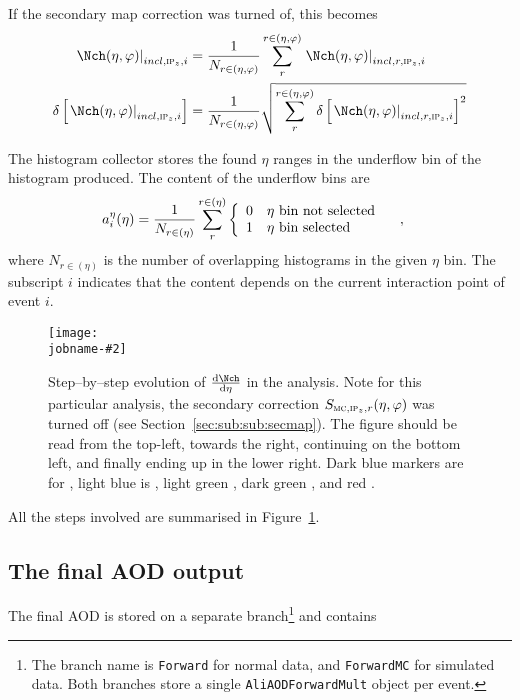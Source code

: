 \documentclass[compat,11pt]{alicenote}
\DeclareRobustCommand{\AlwaysText}[1]{\ifmmode\relax\text{#1}\else #1\fi}
\newcommand*{\etaphi}{\ensuremath(\eta,\varphi)}
\newcommand*\SecMap{\ensuremath S_{\subMC,\subIPz,r}\etaphi}
\newcommand{\AOD}{\AlwaysText{AOD}}
\newcommand{\secref}[1]{Section~\ref{#1}}
\newcommand{\figref}[1]{Figure~\ref{#1}}
\newcommand{\dndetadphi}[1][]{{\ensuremath%
    \ifx|#1|\else\left.\fi%
      \Nch\etaphi%
      \ifx|#1|\else\right|_{#1}\fi}}
\newcommand{\etaCov}{\ensuremath a_i^{\eta}(\eta)}
\newcommand\figinput[2][\textwidth]{%
  \texttt{[image: \\jobname-\#2]}}
\begin{document}
If the secondary map correction was turned of, this becomes 
\begin{align}
  \label{eq:superhist:2}
  \dndetadphi[incl,\subIPz,i] &=
  \frac{1}{N_{r\in\etaphi}}\sum_{r}^{r\in\etaphi}  
  \dndetadphi[incl,r,\subIPz,i]\\
  \delta\left[\dndetadphi[incl,\subIPz,i]\right] &=
  \frac{1}{N_{r\in\etaphi}}\sqrt{\sum_{r}^{r\in\etaphi}   
    \delta\left[\dndetadphi[incl,r,\subIPz,i]\right]^2}
\end{align}

The histogram collector stores the found $\eta$ ranges in the
underflow bin of the histogram produced.  The content of the underflow
bins are 
\begin{align}
  \label{eq:underflow}
  \etaCov &= 
  \frac{1}{N_{r\in(\eta)}}
  \sum_{r}^{r\in(\eta)} \left\{\begin{array}{cl} 
      0 & \eta \text{\ bin not selected}\\ 
      1 & \eta \text{\ bin selected}
      \end{array}\right.\quad,
\end{align}
where $N_{r\in(\eta)}$ is the number of overlapping histograms in the
given $\eta$ bin.  The subscript $i$ indicates that the content
depends on the current interaction point of event $i$.

\begin{figure}[]
  \centering
  \figinput[.9\textwidth]{steps}
  \caption{Step--by--step evolution of $\dndeta$ in the analysis.
    Note for this particular analysis, the secondary correction
    $\SecMap{}$ was turned off (see \secref{sec:sub:sub:secmap}). The
    figure should be read from the top-left, towards the right,
    continuing on the bottom left, and finally ending up in the lower
    right. Dark blue markers are for , light blue is
    , light green , dark green , and red
    .}
  \label{fig:steps}
\end{figure} 

All the steps involved are summarised in \figref{fig:steps}. 

\subsection{The final \AOD{} output} 

The final \FMD{} \AOD{} is stored on a separate branch\footnote{The
  branch name is \texttt{Forward} for normal data, and
  \texttt{ForwardMC} for simulated data. Both branches store a single
  \texttt{AliAODForwardMult} object per event.} and contains 
\end{document}
